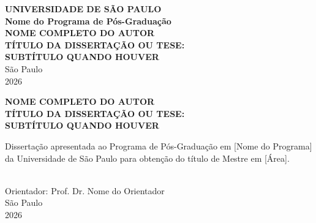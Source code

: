 \documentclass[
    12pt,                   %
    a4paper,                %
    openright,              %
    oneside,                %
    english,                %
    brazil                  %
]{abntex2}
\theoremstyle{plain}
\theoremstyle{definition}
\theoremstyle{remark}
\begin{document}

\renewcommand{\imprimircapa}{%
  \begin{capa}%
    \center
    \textbf{UNIVERSIDADE DE S\~AO PAULO}\\
    \textbf{Nome do Programa de P\'os-Gradua\c{c}\~ao}\\[1cm]
    \textbf{NOME COMPLETO DO AUTOR}\\[4cm]
    \textbf{\large T\'ITULO DA DISSERTA\c{C}\~AO OU TESE:\\
            SUBT\'ITULO QUANDO HOUVER}\\[3cm]
    \vfill
    S\~ao Paulo\\
    2026
  \end{capa}
}

\renewcommand{\imprimirfolhaderosto}{%
  \begin{folhaderosto}
    \center
    \textbf{NOME COMPLETO DO AUTOR}\\[3cm]
    \textbf{\large T\'ITULO DA DISSERTA\c{C}\~AO OU TESE:\\
            SUBT\'ITULO QUANDO HOUVER}\\[2cm]
    \hspace*{\fill}\begin{minipage}{8cm}
    \small
    Disserta\c{c}\~ao apresentada ao Programa de
    P\'os-Gradua\c{c}\~ao em [Nome do Programa] da
    Universidade de S\~ao Paulo para obten\c{c}\~ao do
    t\'itulo de Mestre em [\'Area].
    \end{minipage}\\[2cm]
    \vfill
    Orientador: Prof. Dr. Nome do Orientador\\[1cm]
    S\~ao Paulo\\
    2026
  \end{folhaderosto}
}

\imprimircapa

\imprimirfolhaderosto

\begin{fichacatalografica}
    \vspace*{\fill}
    \begin{center}
    \end{center}
\end{fichacatalografica}
\end{document}
